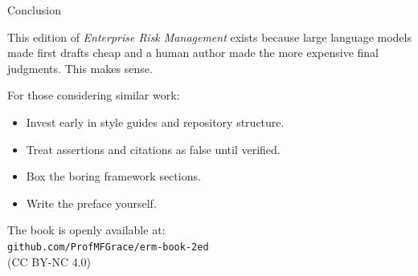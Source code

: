 \documentclass[aspectratio=169]{beamer}
\begin{document}
\begin{frame}{Conclusion}

This edition of \textit{Enterprise Risk Management} exists because large
language models made first drafts cheap and a human author made the more
expensive final judgments. This makes sense.

\bigskip
For those considering similar work:

\begin{itemize}\setlength\itemsep{0.6em}
  \item Invest early in style guides and repository structure.
  \item Treat assertions and citations as false until verified.
  \item Box the boring framework sections.
  \item Write the preface yourself.
\end{itemize}

\bigskip
The book is openly available at:\\
\texttt{github.com/ProfMFGrace/erm-book-2ed}\\
(CC BY-NC 4.0)

\end{frame}

\begin{frame}[plain]
\end{frame}
\end{document}
